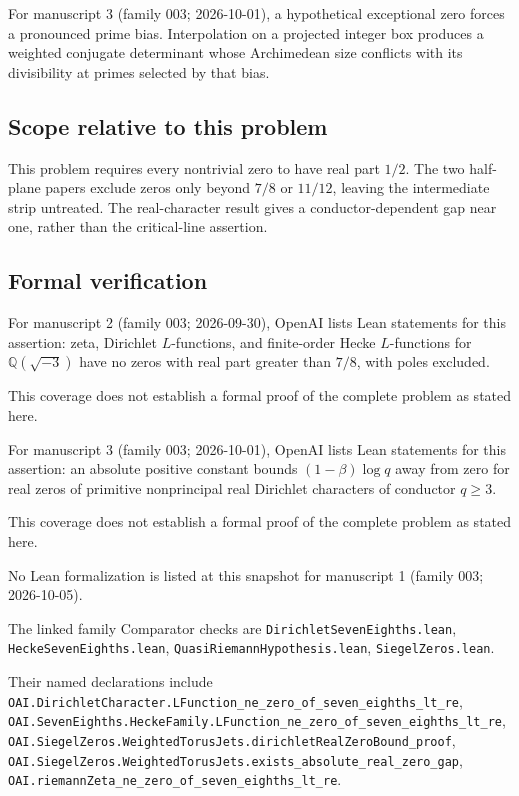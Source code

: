 \documentclass[11pt]{article}
\begin{document}
For manuscript 3 (family 003; 2026-10-01), a hypothetical exceptional zero forces a pronounced prime bias. Interpolation on a projected integer box produces a weighted conjugate determinant whose Archimedean size conflicts with its divisibility at primes selected by that bias.

\subsection{Scope relative to this problem}
This problem requires every nontrivial zero to have real part $1/2$. The two half-plane papers exclude zeros only beyond $7/8$ or $11/12$, leaving the intermediate strip untreated. The real-character result gives a conductor-dependent gap near one, rather than the critical-line assertion.

\subsection{Formal verification}
For manuscript 2 (family 003; 2026-09-30), OpenAI lists Lean statements for this assertion: zeta, Dirichlet $L$-functions, and finite-order Hecke $L$-functions for $\mathbb Q(\sqrt{-3})$ have no zeros with real part greater than $7/8$, with poles excluded.

This coverage does not establish a formal proof of the complete problem as stated here.

For manuscript 3 (family 003; 2026-10-01), OpenAI lists Lean statements for this assertion: an absolute positive constant bounds $(1-\beta)\log q$ away from zero for real zeros of primitive nonprincipal real Dirichlet characters of conductor $q\ge3$.

This coverage does not establish a formal proof of the complete problem as stated here.

No Lean formalization is listed at this snapshot for manuscript 1 (family 003; 2026-10-05).

The linked family Comparator checks are \texttt{DirichletSevenEighths.lean}, \texttt{HeckeSevenEighths.lean}, \texttt{QuasiRiemannHypothesis.lean}, \texttt{SiegelZeros.lean}.

Their named declarations include \texttt{OAI.DirichletCharacter.LFunction\_ne\_zero\_of\_seven\_eighths\_lt\_re}, \texttt{OAI.SevenEighths.HeckeFamily.LFunction\_ne\_zero\_of\_seven\_eighths\_lt\_re}, \texttt{OAI.SiegelZeros.WeightedTorusJets.dirichletRealZeroBound\_proof}, \texttt{OAI.SiegelZeros.WeightedTorusJets.exists\_absolute\_real\_zero\_gap}, \texttt{OAI.riemannZeta\_ne\_zero\_of\_seven\_eighths\_lt\_re}.
\end{document}
